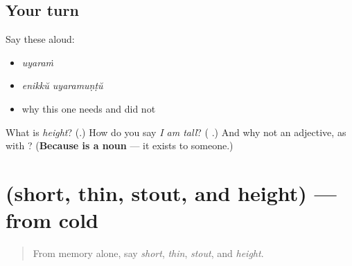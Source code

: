 \subsection*{Your turn}
Say these aloud:

\begin{itemize}
\raggedright
  \item \emph{uyaraṁ}
  \item \emph{enikkŭ uyaramuṇṭŭ}
  \item why this one needs \textbf{} and \textbf{} did not
\end{itemize}

\begin{tcolorbox}[breakable,colback=teal!4,colframe=teal!35!black,title={Before you move on}]
What is \emph{height}? (\textbf{}.) How do you say \emph{I am tall}? (\textbf{ }.) And why not an adjective, as with \textbf{}? (\textbf{Because  is a noun} — it exists to someone.)
\end{tcolorbox}
\section[(short, thin, stout, and height)]{(short, thin, stout, and height) — from cold}

\label{lesson:ML-R101-build-recall}



\begin{quote}
From memory alone, say \emph{short}, \emph{thin}, \emph{stout}, and \emph{height}.
\end{quote}

